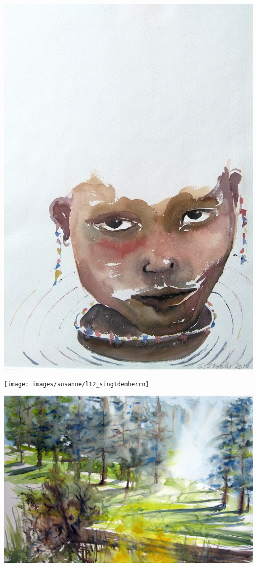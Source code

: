 \documentclass[a4paper,twoside, svgnames]{article}
\begin{document}
\newpage
\begin{center}
\includegraphics[width=0.94\linewidth]{images/susanne/h8_allesaufdenkopfgestellt}\\
\end{center}

\newpage
\begin{center}
\texttt{[image: images/susanne/l12\_singtdemherrn]}\\
\end{center}

\newpage
\begin{center}
\vspace*{5.5cm}
\includegraphics[width=\linewidth]{images/susanne/a1_gedankendesfriedens}\\
\end{center}
\end{document}
